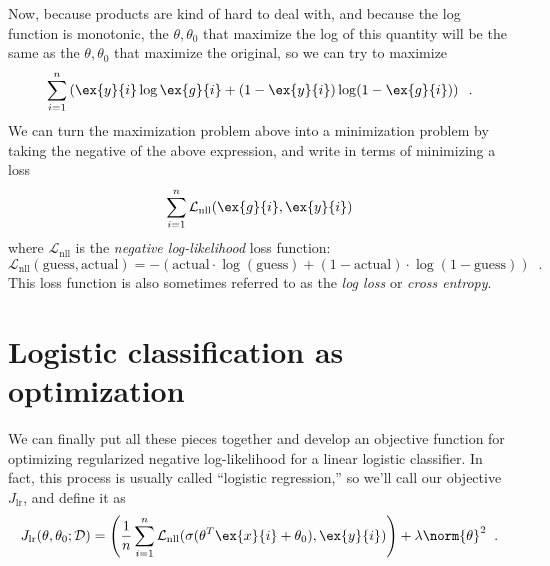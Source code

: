 Now, because products are kind of hard to deal with, and because the
log function is monotonic, the $\theta, \theta_0$ that maximize the
log of this quantity will be the same  as the $\theta, \theta_0$ that
maximize the original, so we can try to maximize
\begin{equation*}
  \sum_{i = 1}^n  \left( {\ex{y}{i}}\log {\ex{g}{i}} +
            (1 - \ex{y}{i})\log(1 - \ex{g}{i})\right)\;\;. 
\end{equation*}
We can turn the maximization problem above into a minimization problem by taking the negative
of the above expression, and write in terms of minimizing a loss
\begin{equation*}
 \sum_{i = 1}^n \mathcal{L}_\text{nll}(\ex{g}{i}, \ex{y}{i})
\end{equation*}
where $\mathcal{L}_\text{nll}$ is the {\em negative log-likelihood}
loss function:
\begin{equation*}
\mathcal{L}_\text{nll}(\text{guess},\text{actual}) = 
-\left(\text{actual}\cdot \log (\text{guess}) + (1 - \text{actual})\cdot\log (1 -
  \text{guess})\right) \;\;.
\end{equation*}
This loss function is also sometimes referred to as the {\em log loss}
or {\em cross entropy}. 

\section{Logistic classification as optimization}

We can finally put all these pieces together and develop an objective
function for optimizing regularized negative log-likelihood for a
linear logistic classifier.   In
  fact, this process is usually called ``logistic regression,'' so
  we'll call our objective $J_\text{lr}$, and define it as
\[J_\text{lr}(\theta, \theta_0; {\cal D}) =
  \left(\frac{1}{n} \sum_{i=1}^n
    \mathcal{L}_\text{nll}(\sigma(\theta^T \ex{x}{i} + \theta_0), \ex{y}{i})\right) +
     \lambda \norm{\theta}^2\;\;.\]

